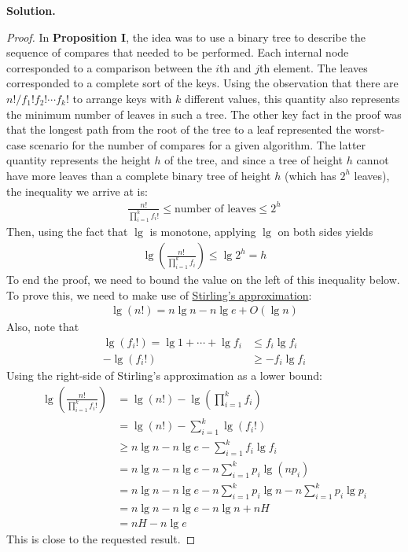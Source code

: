 \documentclass[12pt, a4paper]{article}
\newenvironment{sol}[1][Solution]
{\par\medskip\noindent \textbf{#1.} }
{\medskip}
\begin{document}
\begin{sol}
		\begin{proof}
			In \textbf{Proposition I}, the idea was to use a binary tree to describe
			the sequence of compares that needed to be performed. Each internal node
			corresponded to a comparison between the $i$th and $j$th element. The
			leaves corresponded to a complete sort of the keys. Using the observation
			that there are $n!/f_1!f_2!\cdots f_k!$ to arrange keys with $k$ different
			values, this quantity also represents the minimum number of leaves in
			such a tree. The other key fact in the proof was that the longest path
			from the root of the tree to a leaf represented the worst-case scenario
			for the number of compares for a given algorithm. The latter quantity
			represents the height $h$ of the tree, and since a tree of height
			$h$ cannot have more leaves than a complete binary tree of height $h$
			(which has $2^h$ leaves), the inequality we arrive at is:
			\begin{align*}
				\frac{n!}{\prod_{i=1}^{k}f_i!}\leq \text{number of leaves}\leq 2^h
			\end{align*}
			Then, using the fact that $\lg$ is monotone, applying $\lg$ on
			both sides yields
			\begin{align*}
				\lg\left(\frac{n!}{\prod_{i=1}^{k}f_i}\right)\leq \lg 2^h=h
			\end{align*}
			To end the proof, we need to bound the value on the left of this inequality
			below. To prove this, we need to make use of 
			\href{https://en.wikipedia.org/wiki/Stirling%27s_approximation}{Stirling's approximation}:
			\begin{align*}
				\lg (n!)= n\lg n-n\lg e + O(\lg n)
			\end{align*}
			Also, note that
			\begin{align*}
				\lg (f_i!)=  \lg 1+\cdots+\lg f_i&\leq f_i\lg f_i\\
				-\lg (f_i!)&\geq -f_i\lg f_i
			\end{align*}
			Using the right-side of Stirling's approximation as a lower bound:
			\begin{align*}
				\lg\left(\frac{n!}{\prod_{i=1}^{k}f_i!}\right)
				&=
				\lg( n!)-\lg\left(\prod_{i=1}^{k}f_i\right)\\
				&=
				\lg (n!)-\sum_{i=1}^{k}\lg (f_i!)\\
				&\geq n\lg n - n \lg e - \sum_{i=1}^{k}f_i\lg f_i\\
				&=n\lg n- n \lg e-n\sum_{i=1}^{k}p_i\lg(np_i)\\
				&=n\lg n-n \lg e-n\sum_{i=1}^{k}p_i\lg n-n\sum_{i=1}^{k}p_i\lg p_i\\
				&=n\lg n-n\lg e-n\lg n+nH\\
				&=nH-n \lg e
			\end{align*}
			This is close to the requested result.
		\end{proof}
	\end{sol}
	\pagebreak
	\printbibliography
\end{document}
